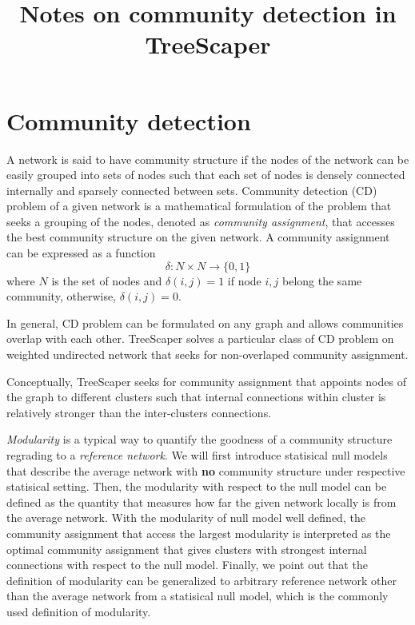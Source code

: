 \documentclass[11pt]{article}
\title{Notes on community detection in TreeScaper}
\theoremstyle{definition}
\theoremstyle{definition}
\theoremstyle{definition}
\theoremstyle{remark}
\theoremstyle{plain}
\begin{document}
\maketitle

\section{Community detection}

A network is said to have community structure if the nodes of the network can be easily grouped into sets of nodes such that each set of nodes is densely connected internally and sparsely connected between sets. Community detection (CD) problem of a given network is a mathematical formulation of the problem that seeks a grouping of the nodes, denoted as \emph{community assignment}, that accesses the best community structure on the given network. A community assignment can be expressed as a function
\[
	\delta:N\times N\to \{0, 1\}
\]
where $N$ is the set of nodes and $\delta(i, j) = 1$ if node $i, j$ belong the same community, otherwise, $\delta(i, j) = 0$.

In general, CD problem can be formulated on any graph and allows communities overlap with each other. TreeScaper solves a particular class of CD problem on weighted undirected network that seeks for non-overlaped community assignment. 

Conceptually, TreeScaper seeks for community assignment that appoints nodes of the graph to different clusters such that internal connections within cluster is relatively stronger than the inter-clusters connections. 

\emph{Modularity} is a typical way to quantify the goodness of a community structure regrading to a \emph{reference network}. We will first introduce statisical null models that describe the average network with \textbf{no} community structure under respective statisical setting. Then, the modularity with respect to the null model can be defined as the quantity that measures how far the given network locally is from the average network. With the modularity of null model well defined, the community assignment that access the largest modularity is interpreted as the optimal community assignment that gives clusters with strongest internal connections with respect to the null model. Finally, we point out that the definition of modularity can be generalized to arbitrary reference network other than the average network from a statisical null model, which is the commonly used definition of modularity.
\end{document}
